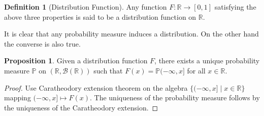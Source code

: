 \documentclass[]{article}
\theoremstyle{definition}
\theoremstyle{definition}
\newtheorem{definition}{Definition}[section]
\newtheorem{proposition}{Proposition}[section]
\begin{document}
\begin{definition}[Distribution Function]
  Any function \(F : \mathbb{R} \to [0, 1]\) satisfying the above three properties 
  is said to be a distribution function on \(\mathbb{R}\).
\end{definition}

It is clear that any probability measure induces a distribution. On the other hand 
the converse is also true.

\begin{proposition}
  Given a distribution function \(F\), there exists a unique probability measure 
  \(\mathbb{P}\) on \((\mathbb{R}, \mathcal{B}(\mathbb{R}))\)
  such that \(F(x) = \mathbb{P}(-\infty, x]\) for all \(x \in \mathbb{R}\).
\end{proposition}
\begin{proof}
  Use Caratheodory extension theorem on the algebra \(\{(-\infty, x] \mid x \in \mathbb{R}\}\) 
  mapping \((-\infty, x] \mapsto F(x)\). The uniqueness of the probability measure 
  follows by the uniqueness of the Caratheodory extension.
\end{proof}
\end{document}
